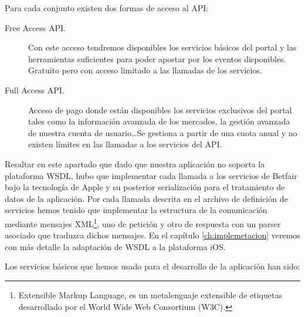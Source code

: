 

  Para cada conjunto existen dos formas de acceso al API:
\begin{description}
	\item [Free Access API.]  Con este acceso tendremos disponibles los servicios básicos del portal y las herramientas suficientes para poder apostar por los eventos disponibles. Gratuito pero con acceso limitado a las llamadas de los servicios.
	\item [Full Access API.] Acceso de pago donde están disponibles los servicios exclusivos del portal tales como la información avanzada de los mercados, la gestión avanzada de nuestra cuenta de usuario\ldots Se gestiona a partir de una cuota anual y no existen límites en las llamadas a los servicios del API.
\end{description}




    Resaltar en este apartado que dado que nuestra aplicación no soporta la plataforma WSDL, hubo que implementar cada llamada a los servicios de Betfair bajo la tecnología de Apple y su posterior serialización para el tratamiento de datos de la aplicación. Por cada llamada descrita en el archivo de definición de servicios hemos tenido que implementar la estructura de la comunicación mediante mensajes XML\footnote{Extensible Markup Language, es un metalenguaje extensible de etiquetas desarrollado por el World Wide Web Consortium (W3C).}, uno de petición y otro de respuesta con un parser asociado que traduzca dichos mensajes. En el capítulo \ref{ch:implemetacion} veremos con más detalle la adaptación de WSDL a la plataforma iOS.

    Los servicios básicos que hemos usado para el desarrollo de la aplicación han sido:

